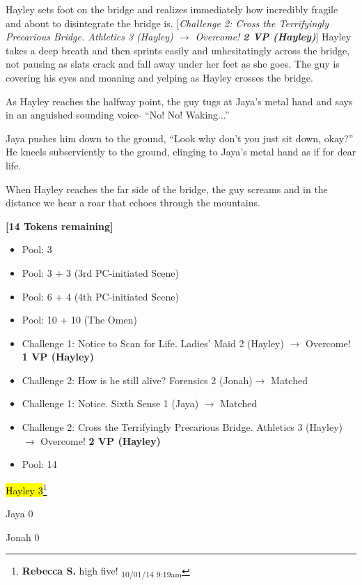 Hayley sets foot on the bridge and realizes immediately how incredibly fragile and about to disintegrate the bridge is.  {[}\textit{Challenge 2: Cross the Terrifyingly Precarious Bridge.  Athletics 3 (Hayley) $\rightarrow$ Overcome! }\textit{\textbf{2 VP (Hayley)}}{]}  Hayley takes a deep breath and then sprints easily and unhesitatingly across the bridge, not pausing as slats crack and fall away under her feet as she goes.  The guy is covering his eyes and moaning and yelping as Hayley crosses the bridge.

As Hayley reaches the halfway point, the guy tugs at Jaya's metal hand and says in an anguished sounding voice- ``No!  No!  Waking...''

Jaya pushes him down to the ground, ``Look why don't you just sit down, okay?''  He kneels subserviently to the ground, clinging to Jaya's metal hand as if for dear life.

When Hayley reaches the far side of the bridge, the guy screams and in the distance we hear a roar that echoes through the mountains.



\textbf{{[}14 Tokens remaining{]}}





\begin{itemize}
\item Pool: 3
\item Pool: 3 + 3 (3rd PC-initiated Scene)
\item Pool: 6 + 4 (4th PC-initiated Scene)
\item Pool: 10 + 10 (The Omen)
\item Challenge 1: Notice to Scan for Life.  Ladies' Maid 2 (Hayley) $\rightarrow$ Overcome! \textbf{1 VP (Hayley)}
\item Challenge 2:  How is he still alive?  Forensics 2 (Jonah)$\rightarrow$ Matched
\item Challenge 1: Notice.  Sixth Sense 1 (Jaya) $\rightarrow$ Matched 
\item Challenge 2: Cross the Terrifyingly Precarious Bridge.  Athletics 3 (Hayley) $\rightarrow$ Overcome! \textbf{2 VP (Hayley)}
\item Pool: 14
\end{itemize}





{\parskip=0pt
\hl{Hayley 3}\footnote{\textbf{Rebecca S. }high five! \textsubscript{10/01/14 9:19am}}

Jaya 0

Jonah 0
}



